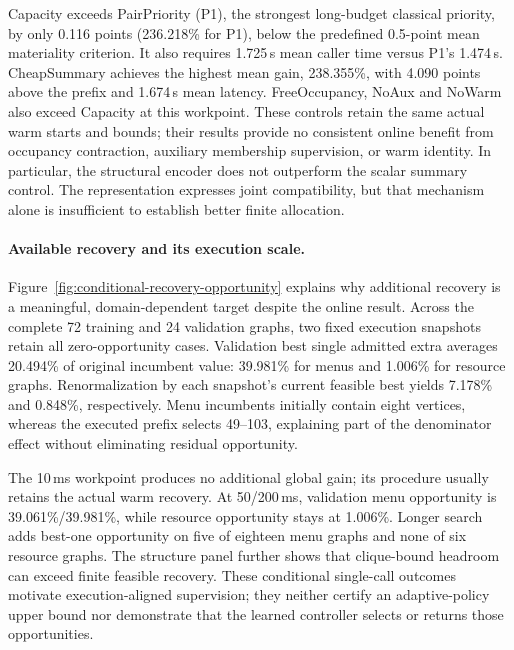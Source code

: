 Capacity exceeds PairPriority (P1), the strongest long-budget classical
priority, by only 0.116 points (236.218\% for P1), below the predefined
0.5-point mean materiality criterion. It also requires 1.725\,s mean
caller time versus P1's 1.474\,s. CheapSummary achieves the highest mean
gain, 238.355\%, with 4.090 points above the prefix and 1.674\,s mean
latency. FreeOccupancy, NoAux and NoWarm also exceed Capacity at this
workpoint. These controls retain the same actual warm starts and bounds;
their results provide no consistent online benefit from occupancy
contraction, auxiliary membership supervision, or warm identity. In
particular, the structural encoder does not outperform the scalar summary
control. The representation expresses joint compatibility, but that
mechanism alone is insufficient to establish better finite allocation.

\paragraph{Available recovery and its execution scale.}
Figure~\ref{fig:conditional-recovery-opportunity} explains why additional
recovery is a meaningful, domain-dependent target despite the online
result. Across the complete 72 training and 24 validation graphs, two
fixed execution snapshots retain all zero-opportunity cases. Validation
best single admitted extra averages 20.494\% of original incumbent value:
39.981\% for menus and 1.006\% for resource graphs. Renormalization by
each snapshot's current feasible best yields 7.178\% and 0.848\%,
respectively. Menu incumbents initially contain eight vertices, whereas
the executed prefix selects 49--103, explaining part of the denominator
effect without eliminating residual opportunity.

The 10\,ms workpoint produces no additional global gain; its procedure
usually retains the actual warm recovery. At 50/200\,ms, validation menu
opportunity is 39.061\%/39.981\%, while resource opportunity stays at
1.006\%. Longer search adds best-one opportunity on five of eighteen menu
graphs and none of six resource graphs. The structure panel further shows
that clique-bound headroom can exceed finite feasible recovery. These
conditional single-call outcomes motivate execution-aligned supervision;
they neither certify an adaptive-policy upper bound nor demonstrate that
the learned controller selects or returns those opportunities.



